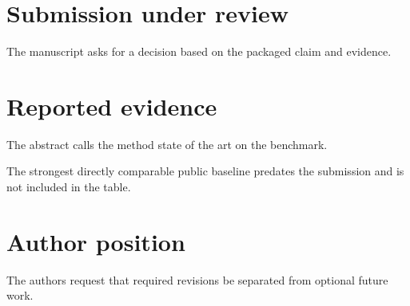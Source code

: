 \documentclass{article}
\begin{document}
\section{Submission under review}
The manuscript asks for a decision based on the packaged claim and evidence.
\section{Reported evidence}
The abstract calls the method state of the art on the benchmark.

The strongest directly comparable public baseline predates the submission and is not included in the table.
\section{Author position}
The authors request that required revisions be separated from optional future work.
\end{document}
